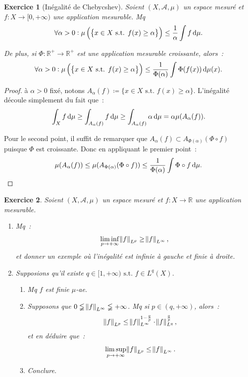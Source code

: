 \documentclass{article}
\newtheorem{ex}{Exercice}[section]
\newcommand{\pinfty}{{+\infty}}
\newcommand{\st}{\text{ s.t. }}
\newcommand{\R}{{\mathbb R}}
\begin{document}
\begin{ex}[Inégalité de Chebycshev] Soient $(X, \mathcal A, \mu)$ un espace mesuré et $f : X \to [0, \pinfty)$ une application mesurable. Mq
\[\forall \alpha > 0 : \mu\left(\left\{x \in X \st f(x) \geq \alpha\right\}\right) \leq \frac 1\alpha\int f\dif\mu.\]

De plus, si $\Phi : \R^+ \to \R^+$ est une application mesurable croissante, alors~:
\[\forall \alpha > 0 : \mu\left(\left\{x \in X \st f(x) \geq \alpha\right\}\right) \leq \frac 1{\Phi(\alpha)}\int \Phi(f(x))\dif\mu(x).\]
\end{ex}

\begin{proof} à $\alpha > 0$ fixé, notons $A_\alpha(f) \coloneqq \{x \in X \st f(x) \geq \alpha\}$. L'inégalité découle simplement du fait que~:
\[\int_Xf\dif\mu \geq \int_{A_\alpha(f)}f\dif\mu \geq \int_{A_\alpha(f)}\alpha\dif\mu = \alpha\mu(A_\alpha(f)).\]

Pour le second point, il suffit de remarquer que $A_\alpha(f) \subset A_{\Phi(\alpha)}(\Phi \circ f)$ puisque $\Phi$ est croissante. Donc en appliquant le premier point~:
\[\mu(A_\alpha(f)) \leq \mu(A_{\Phi(\alpha)}(\Phi \circ f)) \leq \frac 1{\Phi(\alpha)}\int\Phi\circ f\dif\mu.\]
\end{proof}

\begin{ex} Soient $(X, \mathcal A, \mu)$ un espace mesuré et $f : X \to \R$ une application mesurable.
\begin{enumerate}
	\item Mq~:
	\[\liminf_{p \to \pinfty}\norm f_{L^p} \geq \norm f_{L^\infty},\]
	et donner un exemple où l'inégalité est infinie à gauche et finie à droite.
	\item Supposions qu'il existe $q \in [1, \pinfty) \st f \in L^q(X)$.
	\begin{enumerate}
		\item Mq $f$ est finie $\mu$-ae.
		\item Supposons que $0 \lneqq \norm f_{L^\infty} \lneqq \pinfty$. Mq si $p \in (q, \pinfty)$, alors~:
		\[\norm f_{L^p} \leq \norm f_{L^\infty}^{1-\frac qp} \cdot \norm f_{L^q}^{\frac qp},\]
		et en déduire que~:
		\[\limsup_{p \to \pinfty} \norm f_{L^p} \leq \norm f_{L^\infty}.\]
		\item Conclure.
	\end{enumerate}
\end{enumerate}
\end{ex}
\end{document}
